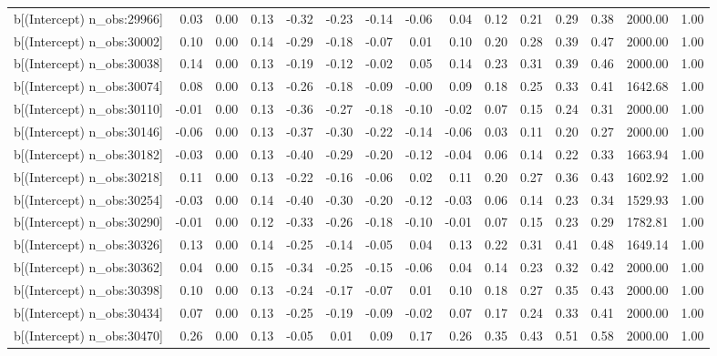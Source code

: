 \begin{table}[ht]
\begin{tabular}{rrrrrrrrrrrrrrr}
  b[(Intercept) n\_obs:29966] & 0.03 & 0.00 & 0.13 & -0.32 & -0.23 & -0.14 & -0.06 & 0.04 & 0.12 & 0.21 & 0.29 & 0.38 & 2000.00 & 1.00 \\ 
  b[(Intercept) n\_obs:30002] & 0.10 & 0.00 & 0.14 & -0.29 & -0.18 & -0.07 & 0.01 & 0.10 & 0.20 & 0.28 & 0.39 & 0.47 & 2000.00 & 1.00 \\ 
  b[(Intercept) n\_obs:30038] & 0.14 & 0.00 & 0.13 & -0.19 & -0.12 & -0.02 & 0.05 & 0.14 & 0.23 & 0.31 & 0.39 & 0.46 & 2000.00 & 1.00 \\ 
  b[(Intercept) n\_obs:30074] & 0.08 & 0.00 & 0.13 & -0.26 & -0.18 & -0.09 & -0.00 & 0.09 & 0.18 & 0.25 & 0.33 & 0.41 & 1642.68 & 1.00 \\ 
  b[(Intercept) n\_obs:30110] & -0.01 & 0.00 & 0.13 & -0.36 & -0.27 & -0.18 & -0.10 & -0.02 & 0.07 & 0.15 & 0.24 & 0.31 & 2000.00 & 1.00 \\ 
  b[(Intercept) n\_obs:30146] & -0.06 & 0.00 & 0.13 & -0.37 & -0.30 & -0.22 & -0.14 & -0.06 & 0.03 & 0.11 & 0.20 & 0.27 & 2000.00 & 1.00 \\ 
  b[(Intercept) n\_obs:30182] & -0.03 & 0.00 & 0.13 & -0.40 & -0.29 & -0.20 & -0.12 & -0.04 & 0.06 & 0.14 & 0.22 & 0.33 & 1663.94 & 1.00 \\ 
  b[(Intercept) n\_obs:30218] & 0.11 & 0.00 & 0.13 & -0.22 & -0.16 & -0.06 & 0.02 & 0.11 & 0.20 & 0.27 & 0.36 & 0.43 & 1602.92 & 1.00 \\ 
  b[(Intercept) n\_obs:30254] & -0.03 & 0.00 & 0.14 & -0.40 & -0.30 & -0.20 & -0.12 & -0.03 & 0.06 & 0.14 & 0.23 & 0.34 & 1529.93 & 1.00 \\ 
  b[(Intercept) n\_obs:30290] & -0.01 & 0.00 & 0.12 & -0.33 & -0.26 & -0.18 & -0.10 & -0.01 & 0.07 & 0.15 & 0.23 & 0.29 & 1782.81 & 1.00 \\ 
  b[(Intercept) n\_obs:30326] & 0.13 & 0.00 & 0.14 & -0.25 & -0.14 & -0.05 & 0.04 & 0.13 & 0.22 & 0.31 & 0.41 & 0.48 & 1649.14 & 1.00 \\ 
  b[(Intercept) n\_obs:30362] & 0.04 & 0.00 & 0.15 & -0.34 & -0.25 & -0.15 & -0.06 & 0.04 & 0.14 & 0.23 & 0.32 & 0.42 & 2000.00 & 1.00 \\ 
  b[(Intercept) n\_obs:30398] & 0.10 & 0.00 & 0.13 & -0.24 & -0.17 & -0.07 & 0.01 & 0.10 & 0.18 & 0.27 & 0.35 & 0.43 & 2000.00 & 1.00 \\ 
  b[(Intercept) n\_obs:30434] & 0.07 & 0.00 & 0.13 & -0.25 & -0.19 & -0.09 & -0.02 & 0.07 & 0.17 & 0.24 & 0.33 & 0.41 & 2000.00 & 1.00 \\ 
  b[(Intercept) n\_obs:30470] & 0.26 & 0.00 & 0.13 & -0.05 & 0.01 & 0.09 & 0.17 & 0.26 & 0.35 & 0.43 & 0.51 & 0.58 & 2000.00 & 1.00 \\ 

\end{tabular}
\end{table}
